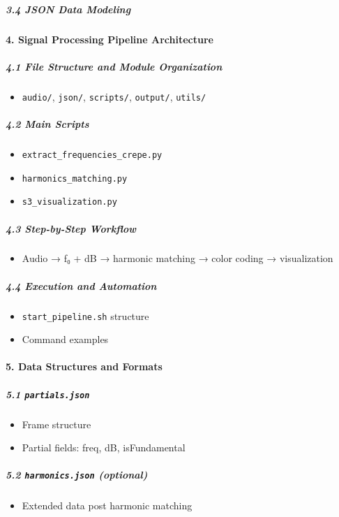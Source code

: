 \subparagraph{3.4 JSON Data Modeling}

\paragraph{4. Signal Processing Pipeline Architecture}

\subparagraph{4.1 File Structure and Module Organization}
\begin{itemize}
    \item \texttt{audio/}, \texttt{json/}, \texttt{scripts/}, \texttt{output/}, \texttt{utils/}
\end{itemize}

\subparagraph{4.2 Main Scripts}
\begin{itemize}
    \item \texttt{extract\_frequencies\_crepe.py}
    \item \texttt{harmonics\_matching.py}
    \item \texttt{s3\_visualization.py}
\end{itemize}

\subparagraph{4.3 Step-by-Step Workflow}
\begin{itemize}
    \item Audio → f₀ + dB → harmonic matching → color coding → visualization
\end{itemize}

\subparagraph{4.4 Execution and Automation}
\begin{itemize}
    \item \texttt{start\_pipeline.sh} structure
    \item Command examples
\end{itemize}

\paragraph{5. Data Structures and Formats}

\subparagraph{5.1 \texttt{partials.json}}
\begin{itemize}
    \item Frame structure
    \item Partial fields: freq, dB, isFundamental
\end{itemize}

\subparagraph{5.2 \texttt{harmonics.json} (optional)}
\begin{itemize}
    \item Extended data post harmonic matching
\end{itemize}

